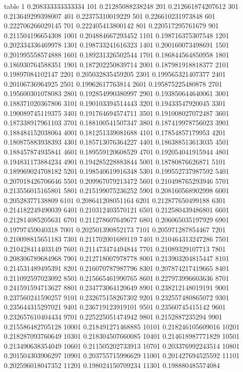 table {%
1 0.208333333333334
101 0.21285088238248
201 0.212661874207612
301 0.213649299398007
401 0.22375310019229
501 0.226610231973848
601 0.222706266029145
701 0.222405413800142
801 0.220517295761679
901 0.211504196654308
1001 0.204884667293452
1101 0.198716375307548
1201 0.202334336469978
1301 0.198733241616323
1401 0.200160073498691
1501 0.201995558574888
1601 0.189231326502544
1701 0.186844564850958
1801 0.186930764588351
1901 0.187202250839714
2001 0.187981918818377
2101 0.19897084102147
2201 0.205032835459205
2301 0.199565321407377
2401 0.20106736964925
2501 0.19962617763814
2601 0.195875225480878
2701 0.195600301078083
2801 0.192854990380997
2901 0.193850644640061
3001 0.188371020367806
3101 0.190103394514443
3201 0.19433547920045
3301 0.190089745119375
3401 0.191764694574711
3501 0.191008027072487
3601 0.187338917961103
3701 0.188100541507347
3801 0.187419978756023
3901 0.188484152038064
4001 0.181251339081688
4101 0.17854857179953
4201 0.180875883938393
4301 0.185713076364227
4401 0.186388513613035
4501 0.188457874935841
4601 0.189559120608529
4701 0.192054041915944
4801 0.194831173884234
4901 0.194285228883844
5001 0.18780876626871
5101 0.189969024708182
5201 0.198540619916348
5301 0.199552737987592
5401 0.207018426706646
5501 0.209967079213472
5601 0.210498765293946
5701 0.213556015165801
5801 0.215199075236252
5901 0.208160568902998
6001 0.20528377138809
6101 0.208641208051164
6201 0.212877650499188
6301 0.214182249490039
6401 0.210312403570121
6501 0.212580439486801
6601 0.212814085205631
6701 0.211278607649677
6801 0.206065035197929
6901 0.19797459040318
7001 0.202501390852173
7101 0.205971287854467
7201 0.210098815651183
7301 0.211702001689119
7401 0.210464313247286
7501 0.210428414403149
7601 0.211473474494844
7701 0.21089329107713
7801 0.208306789684968
7901 0.212718007978778
8001 0.213903204815447
8101 0.214531489495391
8201 0.216070787987796
8301 0.207874217419665
8401 0.211092597023092
8501 0.215665461990765
8601 0.227973996603636
8701 0.241591594713627
8801 0.234773064120649
8901 0.238212148019191
9001 0.237560241590257
9101 0.232675158267302
9201 0.232557480865072
9301 0.235644315297021
9401 0.236719123919101
9501 0.23560745415142
9601 0.232657610404434
9701 0.225225051474942
9801 0.2152887235294
9901 0.215586482705128
10001 0.218491271468885
10101 0.218246105609016
10201 0.218287093760649
10301 0.218304507660085
10401 0.214618987771829
10501 0.213490638354049
10601 0.211505202733913
10701 0.203376992243514
10801 0.201504303906297
10901 0.203755715996629
11001 0.201427694525592
11101 0.202596018047352
11201 0.198024150709234
11301 0.198880485574084
}
